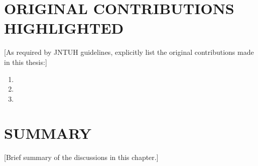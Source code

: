 \section{ORIGINAL CONTRIBUTIONS HIGHLIGHTED}

[As required by JNTUH guidelines, explicitly list the original
contributions made in this thesis:]

\begin{enumerate}
    \item [Original contribution 1]
    \item [Original contribution 2]
    \item [Original contribution 3]
\end{enumerate}

\section{SUMMARY}

[Brief summary of the discussions in this chapter.]




























































